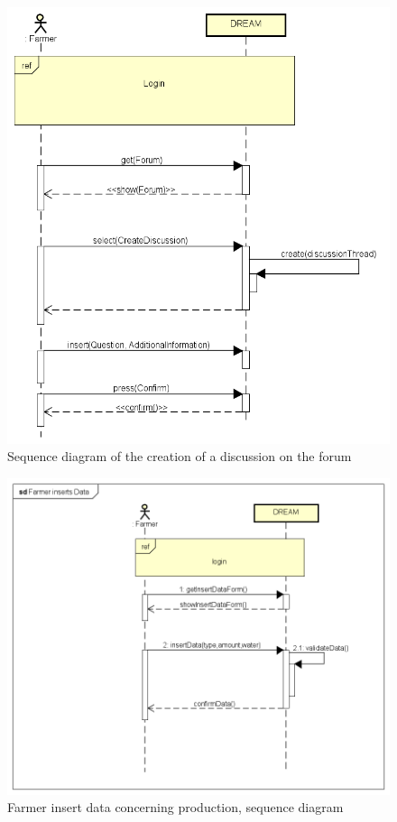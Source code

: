 \bigskip
\begin{figure}[H]
    \centering
    \includegraphics[scale=0.7]{Images/createDiscussion.png}
    \caption{Sequence diagram of the creation of a discussion on the forum}
\end{figure}

\bigskip
\begin{figure}[H]
    \centering
    \includegraphics[scale=0.7]{Images/FarmerInsertsDataSequence.png}
    \caption{Farmer insert data concerning production, sequence diagram}
\end{figure}

